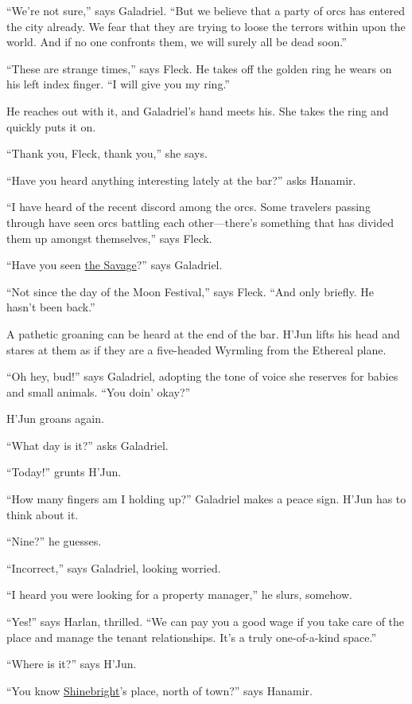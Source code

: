 \documentclass[smalldemyvopaper,11pt,twoside,onecolumn,openright,extrafontsizes]{memoir}
\begin{document}
``We're not sure,'' says Galadriel. ``But we believe that a party of
orcs has entered the city already. We fear that they are trying to loose
the terrors within upon the world. And if no one confronts them, we will
surely all be dead soon.''

``These are strange times,'' says Fleck. He takes off the golden ring he
wears on his left index finger. ``I will give you my ring.''

He reaches out with it, and Galadriel's hand meets his. She takes the
ring and quickly puts it on.

``Thank you, Fleck, thank you,'' she says.

``Have you heard anything interesting lately at the bar?'' asks Hanamir.

``I have heard of the recent discord among the orcs. Some travelers
passing through have seen orcs battling each other---there's something
that has divided them up amongst themselves,'' says Fleck.

``Have you seen \href{/characters/the-savage/}{the Savage}?'' says
Galadriel.

``Not since the day of the Moon Festival,'' says Fleck. ``And only
briefly. He hasn't been back.''

A pathetic groaning can be heard at the end of the bar. H'Jun lifts his
head and stares at them as if they are a five-headed Wyrmling from the
Ethereal plane.

``Oh hey, bud!'' says Galadriel, adopting the tone of voice she reserves
for babies and small animals. ``You doin' okay?''

H'Jun groans again.

``What day is it?'' asks Galadriel.

``Today!'' grunts H'Jun.

``How many fingers am I holding up?'' Galadriel makes a peace sign.
H'Jun has to think about it.

``Nine?'' he guesses.

``Incorrect,'' says Galadriel, looking worried.

``I heard you were looking for a property manager,'' he slurs, somehow.

``Yes!'' says Harlan, thrilled. ``We can pay you a good wage if you take
care of the place and manage the tenant relationships. It's a truly
one-of-a-kind space.''

``Where is it?'' says H'Jun.

``You know \href{/characters/shinebright/}{Shinebright}'s place, north
of town?'' says Hanamir.
\end{document}
